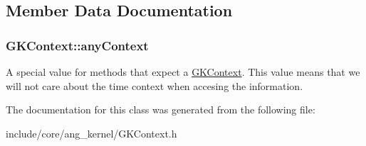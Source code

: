 \subsection{Member Data Documentation}
\subsubsection[{\texorpdfstring{any\+Context}{anyContext}}]{ G\+K\+Context\+::any\+Context\hspace{0.3cm}{\ttfamily [static]}}\hypertarget{classGKContext_a37de2dc1b6bab087b9b92a445922e79d}{}\label{classGKContext_a37de2dc1b6bab087b9b92a445922e79d}
A special value for methods that expect a \hyperlink{classGKContext}{G\+K\+Context}. This value means that we will not care about the time context when accesing the information. 

The documentation for this class was generated from the following file\+:\begin{DoxyCompactItemize}
\item 
include/core/ang\+\_\+kernel/G\+K\+Context.\+h\end{DoxyCompactItemize}
